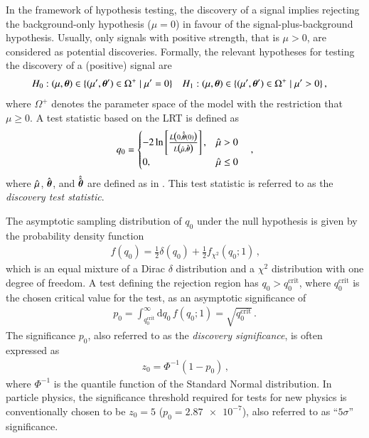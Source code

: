 In the framework of hypothesis testing, the discovery of a signal implies
rejecting the background-only hypothesis ($\mu = 0$) in favour of the
signal-plus-background hypothesis. Usually, only signals with positive strength,
that is $\mu > 0$, are considered as potential discoveries. Formally, the
relevant hypotheses for testing the discovery of a (positive) signal are
\begin{align*}
  &H_0: (\mu, \myvec{\theta}) \in \{ (\mu^\prime, \myvec{\theta}^\prime) \in \Omega^+ \mid \mu^\prime = 0 \}
  &&H_1: (\mu, \myvec{\theta}) \in \{ (\mu^\prime, \myvec{\theta}^\prime) \in \Omega^+ \mid \mu^\prime > 0 \} \,\text{,}
\end{align*}
where $\Omega^+$ denotes the parameter space of the model with the restriction
that $\mu \geq 0$. A test statistic based on the LRT is defined
as~\cite{Cowan:2010js}
\begin{align*}
  q_0 = \begin{cases}
          -2 \ln \left[ \frac{ L\bigl(0, \hat{\hat{\myvec{\theta}}}(0) \bigr)}{L\bigl( \muhat, \hat{\myvec{\theta}} \bigr)} \right], & \muhat > 0 \\
          0,          & \muhat \leq 0
        \end{cases} \quad\text{,}
\end{align*}
where $\hat{\mu}$, $\hat{\myvec{\theta}}$, and $\hat{\hat{\myvec{\theta}}}$ are
defined as in . This test
statistic is referred to as the \emph{discovery test statistic}.

The asymptotic sampling distribution of $q_0$ under the null hypothesis is given
by the probability density function~\cite{Cowan:2010js}
\begin{align*}
  f(q_0) = \frac{1}{2} \delta(q_0) + \frac{1}{2} f_{\chi^2}(q_0; 1) \,\text{,}
\end{align*}
which is an equal mixture of a Dirac $\delta$ distribution and a $\chi^2$
distribution with one degree of freedom. A test defining the rejection region
has $q_0 > q_0^{\text{crit}}$, where $q_0^{\text{crit}}$ is the chosen critical
value for the test, as an asymptotic significance of
\begin{align*}
  p_0 = \int_{q_0^\text{crit}}^\infty \mathrm{d}q_0 \, f(q_0; 1) = \sqrt{q_0^\text{crit}} \,\text{.}
\end{align*}
The significance $p_0$, also referred to as the \emph{discovery significance},
is often expressed as
\begin{align*}
  z_0 = \Phi^{-1}(1 - p_0) \,\text{,}
\end{align*}
where $\Phi^{-1}$ is the quantile function of the Standard Normal
distribution. In particle physics, the significance threshold required for tests
for new physics is conventionally chosen to be $z_0 = 5$
($p_0 = \num{2.87e-7}$), also referred to as ``$5\sigma$'' significance.

